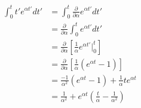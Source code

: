 \documentclass[12pt]{article}
\begin{document}
\newpage

\begin{subequations}\begin{align}
\int_0^t t' e^{\alpha t'} dt' &= \int_0^t \frac{\partial}{\partial \alpha}
e^{\alpha t'} dt'
\\
&= \frac{\partial}{\partial \alpha} \int_0^t e^{\alpha t'} dt'
\\
&= \frac{\partial}{\partial \alpha} \left[
\frac{1}{\alpha} e^{\alpha t'} \Bigg|_0^t\right]
\\
&= \frac{\partial}{\partial \alpha} \left[
\frac{1}{\alpha} \left(e^{\alpha t} - 1\right)\right]
\\
&= \frac{-1}{\alpha^2} \left(e^{\alpha t} - 1\right) +
\frac{1}{\alpha} te^{\alpha t}
\\
&= \frac{1}{\alpha^2} + e^{\alpha t} \left(\frac{t}{\alpha} -
\frac{1}{\alpha^2}\right)
\end{align}\end{subequations}
\end{document}
